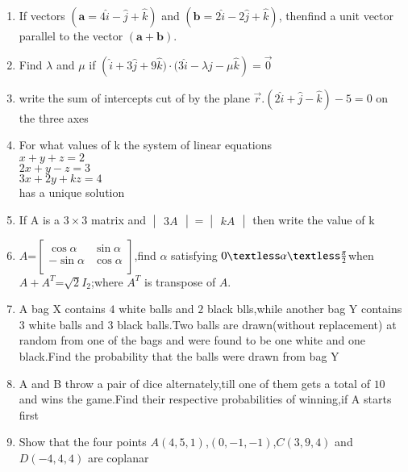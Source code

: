 \documentclass[12pt,-letter paper]{article}
\let\vec\mathbf{}
\let\vec\mathbf{}
\let\vec\mathbf{}
\providecommand{\mydet}[1]{\ensuremath{\begin{vmatrix}#1\end{vmatrix}}}
\providecommand{\myvec}[1]{\ensuremath{\begin{bmatrix}#1\end{bmatrix}}}
\providecommand{\brak}[1]{\ensuremath{\left(#1\right)}}
\begin{document}
\begin{enumerate}
	\item If vectors $\brak{\vec{a} = 4\hat{i} - \hat{j} + \hat{k}}$ and $\brak{\vec{b} = 2\hat{i} - 2\hat{j} + \hat{k}}$, thenfind a unit vector parallel to the vector $\brak{\vec{a} + \vec{b}}$.

 \item Find $\lambda$ and $\mu$ if 
	 $\brak{\hat{i} +3\hat{j} + 9\hat{k}) \cdot (3\hat{i} - \lambda \hat{j} - \mu \hat{k}} =\overset\rightarrow 0$
  

 \item  write the sum of intercepts cut of by the plane $    \overset{\rightarrow}{r}.\brak{2\hat{i}+\hat{j}-\hat{k}}-5=0$     on the three axes



\item For what values of k the system of linear equations\\
$x+y+z=2$\\
$2x+y-z=3$\\
$3x+2y+kz=4$\\
has a unique solution

\item If A is a $3\times3$ matrix and $\mydet{3A}=\mydet{kA}$ then     write the value of k


 \item $A$=$\myvec{\cos\alpha&\sin\alpha\\                           -\sin\alpha&\cos\alpha\\}$,find $\alpha$ satisfying $0\textless\alpha\textless\frac{\pi}{2}$when $A+A^T$=$\sqrt{2}$$I_{2}$;where $A^T$ is     transpose of $A$.

	\item A bag X contains $4$ white balls and $2$ black blls,while another bag Y contains $3$ white balls and $3$ black balls.Two balls are drawn(without replacement) at random from one of the bags and were found to be one white and one black.Find the probability that the balls were drawn from bag Y
	
	\item A and B throw a pair of dice alternately,till one of them gets a total of $10$ and wins the game.Find their respective probabilities of winning,if A starts first		


	\item Show that the four points $A\brak{4,5,1}$,$\brak{0,-1,-1}$,$C\brak{3,9,4}$ and $D\brak{-4,4,4}$ are coplanar





\end{enumerate}
\end{document}
